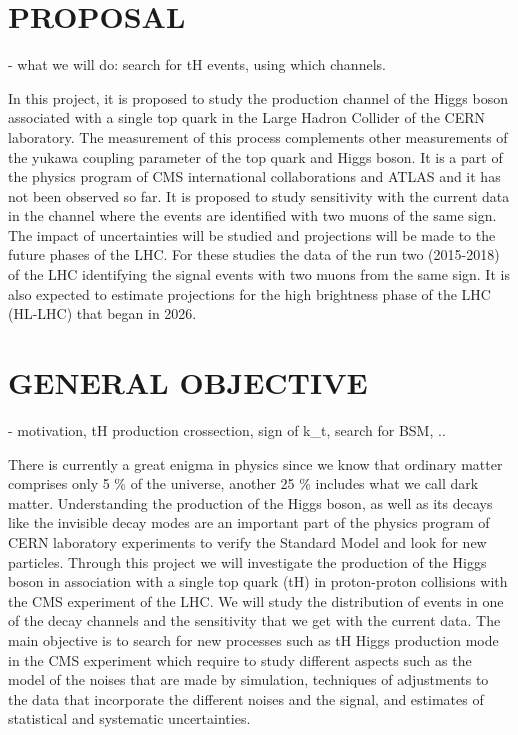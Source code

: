 \documentclass[final,3p]{CSP}
\begin{document}
\section{PROPOSAL}
- what we will do:  search for tH events, using which channels.

In this project, it is proposed to study the production channel of the Higgs boson associated with a single top quark in the Large 
Hadron Collider of the CERN laboratory. The measurement of this process complements other measurements of the yukawa coupling parameter 
of the top quark and Higgs boson. It is a part of the physics program of CMS international collaborations and ATLAS and it has not been 
observed so far. It is proposed to study sensitivity with the current data in the channel where the events are identified with two muons 
of the same sign. The impact of uncertainties will be studied and projections will be made to the future phases of the LHC. For these 
studies the data of the run two (2015-2018) of the LHC identifying the signal events with two muons from the same sign. It is also 
expected to estimate projections for the high brightness phase of the LHC (HL-LHC) that began in 2026.

\section{GENERAL OBJECTIVE}
- motivation, tH production crossection, sign of k_t, search for BSM, ..

There is currently a great enigma in physics since we know that ordinary matter comprises only 5 \% of the universe, another 
25 \% includes what we call dark matter. Understanding the production of the Higgs boson, as well as its decays like the invisible 
decay modes are an important part of the physics program of CERN laboratory experiments to verify the Standard Model and look for new 
particles. Through this project we will investigate the production of the Higgs boson in association with a single top quark (tH) 
in proton-proton collisions with the CMS experiment of the LHC. We will study the distribution of events in one of the decay channels 
and the sensitivity that we get with the current data. The main objective is to search for new processes such as tH Higgs production 
mode in the CMS experiment which require to study different aspects such as the model of the noises that are made by simulation, 
techniques of adjustments to the data that incorporate the different noises and the signal, and estimates of statistical and systematic 
uncertainties.
\end{document}

